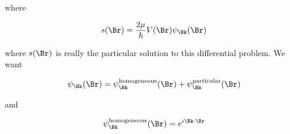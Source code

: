 where

\begin{equation}\label{eqn:qmTwoL24:n}
s(\Br) = \frac{2\mu}{\hbar} V(\Br) \psi_\Bk(\Br)
\end{equation}

where $s(\Br)$ is really the particular solution to this differential problem.   We want

\begin{equation}\label{eqn:qmTwoL24:n}
\psi_\Bk(\Br) =
\psi_\Bk^{\text{homogeneous}}(\Br)
+ \psi_\Bk^{\text{particular}}(\Br)
\end{equation}

and

\begin{equation}\label{eqn:qmTwoL24:n}
\psi_\Bk^{\text{homogeneous}}(\Br) = e^{i \Bk \cdot \Br}
\end{equation}

\EndArticle
